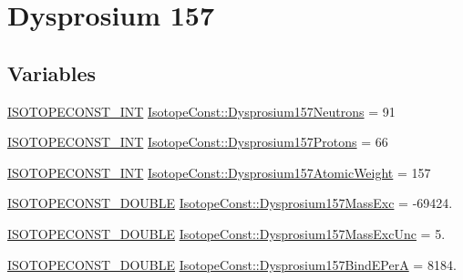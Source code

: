 \hypertarget{group___isotope_const-_dysprosium-_dy157}{}\section{Dysprosium 157}
\label{group___isotope_const-_dysprosium-_dy157}
\subsection*{Variables}
\begin{DoxyCompactItemize}
\item 
\mbox{\hyperlink{group___isotope_const-_macros_ga5f18360b3e99483a35c32d789e62621c}{I\+S\+O\+T\+O\+P\+E\+C\+O\+N\+S\+T\+\_\+\+I\+NT}} \mbox{\hyperlink{group___isotope_const-_dysprosium-_dy157_gac95e3e05d08a5ed22434f999d69e1dce}{Isotope\+Const\+::\+Dysprosium157\+Neutrons}} = 91
\item 
\mbox{\hyperlink{group___isotope_const-_macros_ga5f18360b3e99483a35c32d789e62621c}{I\+S\+O\+T\+O\+P\+E\+C\+O\+N\+S\+T\+\_\+\+I\+NT}} \mbox{\hyperlink{group___isotope_const-_dysprosium-_dy157_ga719b723a9a0836a03da0175b1d4f8cbd}{Isotope\+Const\+::\+Dysprosium157\+Protons}} = 66
\item 
\mbox{\hyperlink{group___isotope_const-_macros_ga5f18360b3e99483a35c32d789e62621c}{I\+S\+O\+T\+O\+P\+E\+C\+O\+N\+S\+T\+\_\+\+I\+NT}} \mbox{\hyperlink{group___isotope_const-_dysprosium-_dy157_ga2a76dd44b97da4ae808b1686a96fce5f}{Isotope\+Const\+::\+Dysprosium157\+Atomic\+Weight}} = 157
\item 
\mbox{\hyperlink{group___isotope_const-_macros_ga8f45a7272ce02c0b4c65c44636ed719a}{I\+S\+O\+T\+O\+P\+E\+C\+O\+N\+S\+T\+\_\+\+D\+O\+U\+B\+LE}} \mbox{\hyperlink{group___isotope_const-_dysprosium-_dy157_ga8fa44c75f24dca623ef350cffd6620cd}{Isotope\+Const\+::\+Dysprosium157\+Mass\+Exc}} = -\/69424.
\item 
\mbox{\hyperlink{group___isotope_const-_macros_ga8f45a7272ce02c0b4c65c44636ed719a}{I\+S\+O\+T\+O\+P\+E\+C\+O\+N\+S\+T\+\_\+\+D\+O\+U\+B\+LE}} \mbox{\hyperlink{group___isotope_const-_dysprosium-_dy157_ga72f4a8bce5cae15a4ff1452d5e451f96}{Isotope\+Const\+::\+Dysprosium157\+Mass\+Exc\+Unc}} = 5.
\item 
\mbox{\hyperlink{group___isotope_const-_macros_ga8f45a7272ce02c0b4c65c44636ed719a}{I\+S\+O\+T\+O\+P\+E\+C\+O\+N\+S\+T\+\_\+\+D\+O\+U\+B\+LE}} \mbox{\hyperlink{group___isotope_const-_dysprosium-_dy157_gabea2563c222a22b7aae0fb0ac66d51c4}{Isotope\+Const\+::\+Dysprosium157\+Bind\+E\+PerA}} = 8184.

\end{DoxyCompactItemize}
